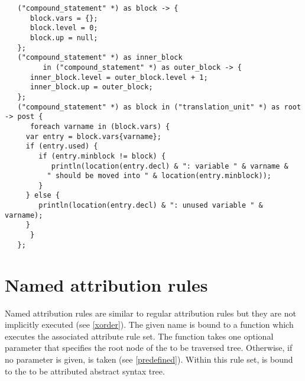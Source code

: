\begin{lstlisting}
   ("compound_statement" *) as block -> {
      block.vars = {};
      block.level = 0;
      block.up = null;
   };
   ("compound_statement" *) as inner_block
         in ("compound_statement" *) as outer_block -> {
      inner_block.level = outer_block.level + 1;
      inner_block.up = outer_block;
   };
   ("compound_statement" *) as block in ("translation_unit" *) as root -> post {
      foreach varname in (block.vars) {
	 var entry = block.vars{varname};
	 if (entry.used) {
	    if (entry.minblock != block) {
	       println(location(entry.decl) & ": variable " & varname &
		  " should be moved into " & location(entry.minblock));
	    }
	 } else {
	    println(location(entry.decl) & ": unused variable " & varname);
	 }
      }
   };
\end{lstlisting}

\section{Named attribution rules}\label{named-atrules}

Named attribution rules are similar to regular attribution rules but
they are not implicitly executed (see \ref{xorder}). The given name
is bound to a function which executes the associated attribute rule
set. The function takes one optional parameter that specifies the
root node of the to be traversed tree. Otherwise, if no parameter is
given,  is taken (see \ref{predefined}).
Within this rule set,  is bound to the
to be attributed abstract syntax tree.

\begin{grammar}
      \produces {} 
	 \lextoken{\{} 
	 \lextoken{\}}
\end{grammar}

\endinput

